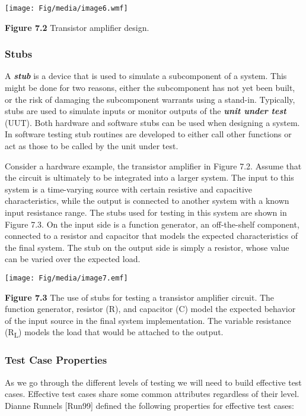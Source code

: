 \texttt{[image: Fig/media/image6.wmf]}

\textbf{Figure 7.2} Transistor amplifier design.

\subsubsection{Stubs}\label{stubs}

A \emph{\textbf{stub}} is a device that is used to simulate a
subcomponent of a system. This might be done for two reasons, either the
subcomponent has not yet been built, or the risk of damaging the
subcomponent warrants using a stand-in. Typically, stubs are used to
simulate inputs or monitor outputs of the \emph{\textbf{unit under
test}} (UUT). Both hardware and software stubs can be used when
designing a system. In software testing stub routines are developed to
either call other functions or act as those to be called by the unit
under test.

Consider a hardware example, the transistor amplifier in Figure 7.2.
Assume that the circuit is ultimately to be integrated into a larger
system. The input to this system is a time-varying source with certain
resistive and capacitive characteristics, while the output is connected
to another system with a known input resistance range. The stubs used
for testing in this system are shown in Figure 7.3. On the input side is
a function generator, an off-the-shelf component, connected to a
resistor and capacitor that models the expected characteristics of the
final system. The stub on the output side is simply a resistor, whose
value can be varied over the expected load.

\texttt{[image: Fig/media/image7.emf]}

\textbf{Figure 7.3} The use of stubs for testing a transistor amplifier
circuit. The function generator, resistor (R), and capacitor (C) model
the expected behavior of the input source in the final system
implementation. The variable resistance (R\textsubscript{L}) models the
load that would be attached to the output.

\subsubsection{Test Case Properties}\label{test-case-properties}

As we go through the different levels of testing we will need to build
effective test cases. Effective test cases share some common attributes
regardless of their level. Dianne Runnels {[}Run99{]} defined the
following properties for effective test cases:

